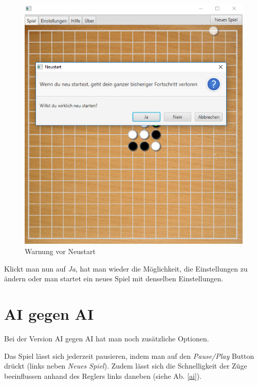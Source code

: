 \documentclass[11pt]{article}
\newcommand{\1}{{\mathds{1}}}
\newcommand{\imagewidth}{.6\textheight}%
\begin{document}
	\begin{figure}[h]
		\centering
		\includegraphics[width=\imagewidth]{warnung.png}
		\caption{Warnung vor Neustart}
		\label{warnung}
	\end{figure}
	
	Klickt man nun auf \textit{Ja}, hat man wieder die Möglichkeit, die Einstellungen zu ändern oder man startet ein neues Spiel mit denselben Einstellungen. 
	
	\FloatBarrier
	\section{AI gegen AI}
	\FloatBarrier
	
	Bei der Version AI gegen AI hat man noch zusätzliche Optionen. 
	
	Das Spiel lässt sich jederzeit pausieren, indem man auf den \textit{Pause/Play} Button drückt (links neben \textit{Neues Spiel}).
	Zudem lässt sich die Schnelligkeit der Züge beeinflussen anhand des Reglers links daneben (siehe Ab. \ref{ai}).
	
\end{document}
